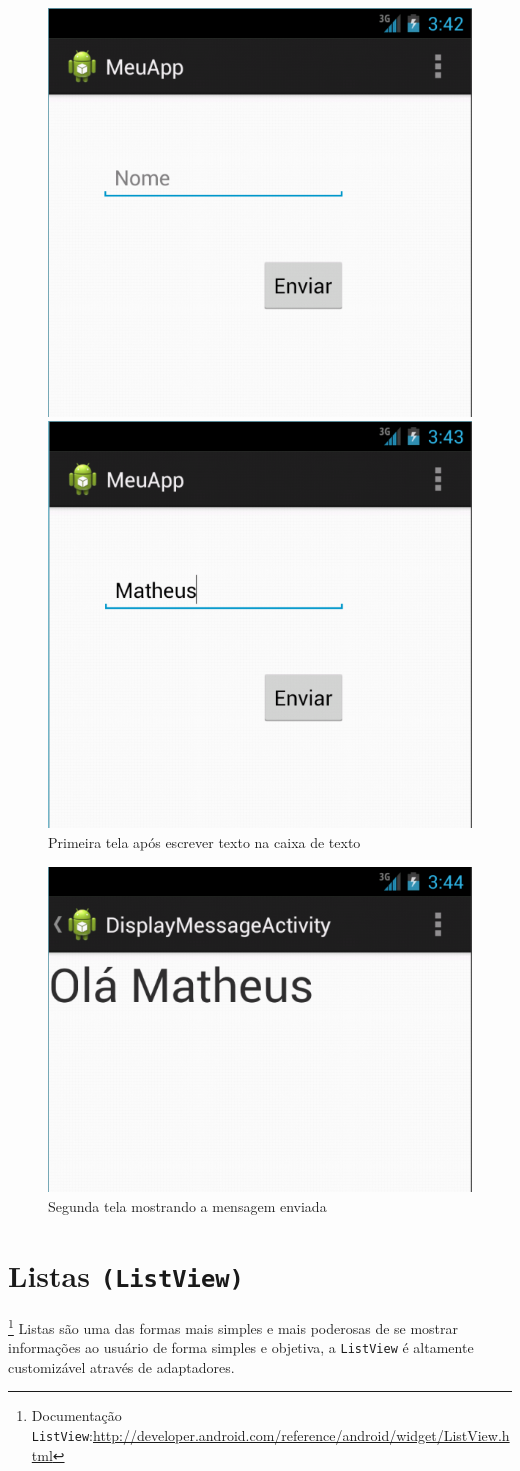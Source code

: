 \documentclass[a4paper,12pt,brazil,doubleside]{book}
\begin{document}
\begin{singlespace}
\begin{figure}[H]
  \centering
  \includegraphics[width=.4\textwidth]{figuras/6-criando-app.png}
  \caption{Primeira tela do primeiro aplicativo}
  \label{fig:f}
  \includegraphics[width=.4\textwidth]{figuras/7-criando-app.png}
  \caption{Primeira tela após escrever texto na caixa de texto}
  \label{fig:g}
\end{figure}
\begin{figure}[H]
  \centering
  \includegraphics[width=.4\textwidth]{figuras/8-criando-app.png}
  \caption{Segunda tela mostrando a mensagem enviada}
  \label{fig:h}
\end{figure}


\section{Listas \texttt{(ListView)}}\footnote{Documentação \texttt{ListView}:\href{http://developer.android.com/reference/android/widget/ListView.html}{http://developer.android.com/reference/android/widget/ListView.html}}
Listas são uma das formas mais simples e mais poderosas de se mostrar informações ao usuário de forma simples e objetiva, a \texttt{ListView} é altamente customizável através de adaptadores.


\end{singlespace}
\end{document}
